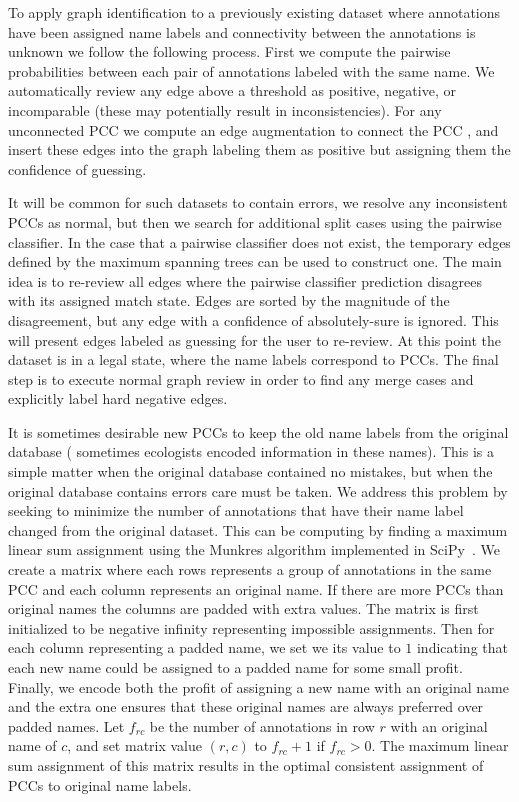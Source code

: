 
To apply graph identification to a previously existing dataset where annotations have been assigned name labels and
connectivity between the annotations is unknown we follow the following process. First we compute the pairwise
probabilities between each pair of annotations labeled with the same name. We automatically review any edge above a
threshold as positive, negative, or incomparable (these may potentially result in inconsistencies). For any unconnected
PCC we compute an edge augmentation to connect the PCC \cite{eswaran_augmentation_1976,khuller_approximation_1993}, and
insert these edges into the graph labeling them as positive but assigning them the confidence of guessing.

It will be common for such datasets to contain errors, we resolve any inconsistent PCCs as normal, but then we search
for additional split cases using the pairwise classifier. In the case that a pairwise classifier does not exist, the
temporary edges defined by the maximum spanning trees can be used to construct one. The main idea is to re-review all
edges where the pairwise classifier prediction disagrees with its assigned match state. Edges are sorted by the
magnitude of the disagreement, but any edge with a confidence of absolutely-sure is ignored. This will present edges
labeled as guessing for the user to re-review. At this point the dataset is in a legal state, where the name labels
correspond to PCCs. The final step is to execute normal graph review in order to find any merge cases and explicitly
label hard negative edges.

It is sometimes desirable new PCCs to keep the old name labels from the original database (\eg{} sometimes ecologists
encoded information in these names). This is a simple matter when the original database contained no mistakes, but when
the original database contains errors care must be taken. We address this problem by seeking to minimize the number of
annotations that have their name label changed from the original dataset. This can be computing by finding a maximum
linear sum assignment using the Munkres algorithm implemented in SciPy~\cite{eric_jones_scipy_2001}. We create a matrix
where each rows represents a group of annotations in the same PCC and each column represents an original name. If there
are more PCCs than original names the columns are padded with extra values. The matrix is first initialized to be
negative infinity representing impossible assignments. Then for each column representing a padded name, we set we its
value to $1$ indicating that each new name could be assigned to a padded name for some small profit. Finally, we encode
both the profit of assigning a new name with an original name and the extra one ensures that these original names are
always preferred over padded names. Let $f_{rc}$ be the number of annotations in row $r$ with an original name of $c$,
and set matrix value $(r, c)$ to $f_{rc} + 1$ if $f_{rc} > 0$. The maximum linear sum assignment of this matrix results
in the optimal consistent assignment of PCCs to original name labels.
  
